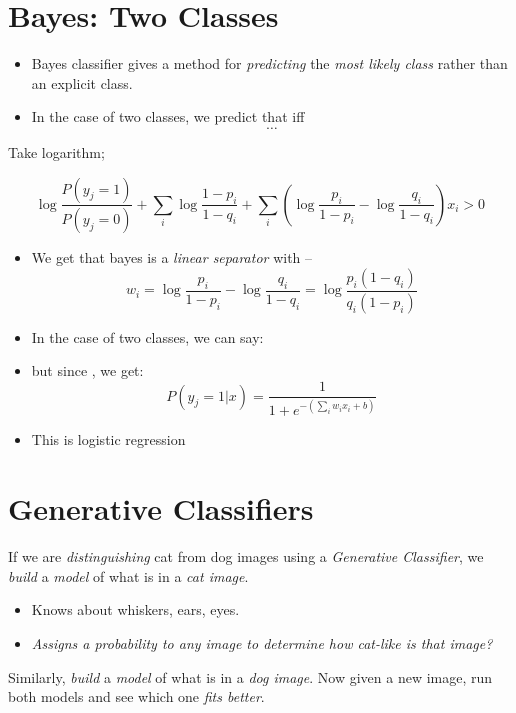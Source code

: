 \documentclass[
	title={Logistic Regression}
]{cs584notes}
\begin{document}

\tableofcontents

\section{\naive Bayes: Two Classes}\label{sec:naive-bayes:-two-classes}
\begin{itemize}
	\item \naive Bayes classifier gives a method for \emph{predicting} the \emph{most likely class} rather than an explicit class.
	\item In the case of two classes,  we predict that  iff
	\[ \dots \]
\end{itemize}

Take logarithm;

\[ \log \frac{P(y_{j}=1)}{P(y_{j}=0)} + \sum_{i}\log \frac{1-p_{i}}{1-q_{i}} + \sum_{i}\left( \log\frac{p_{i}}{1-p_{i}} - \log\frac{q_{i}}{1-q_{i}} \right)x_{i} > 0 \]
\begin{itemize}
	\item We get that \naive bayes is a \emph{linear separator} with --
	\[ w_{i} = \log\frac{p_{i}}{1 - p_{i}} - \log\frac{q_{i}}{1 - q_{i}} = \log\frac{p_{i}(1-q_{i})}{q_{i}(1-p_{i})} \]
	\item In the case of two classes, we can say:
	\item but since , we get:
	\[ P(y_{j}=1|x) = \frac{1}{1+e^{-\left( \sum_{i}w_{i}x_{i} + b \right)}} \]
	\item This is logistic regression
\end{itemize}

\section{Generative Classifiers}\label{sec:generative-classifiers}
If we are \emph{distinguishing} cat from dog images using a \emph{Generative Classifier}, we \emph{build} a \emph{model} of what is in a \emph{cat image}.
\begin{itemize}
	\item Knows about whiskers, ears, eyes.
	\item \emph{Assigns a probability to any image to determine how cat-like is that image?}
\end{itemize}
Similarly, \emph{build} a \emph{model} of what is in a \emph{dog image}.
Now given a new image, run both models and see which one \emph{fits better}.
\end{document}
